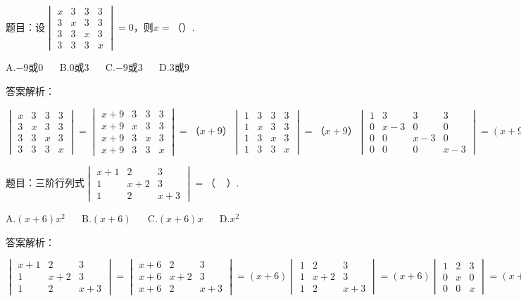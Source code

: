 题目：$设\begin{vmatrix}x&3&3&3\\3&x&3&3\\3&3&x&3\\3&3&3&x\end{vmatrix}=0，则x=（）.$

A.$-9或0$ $\quad$ B.$0或3$ $\quad$ C.$-9或3$ $\quad$ D.$3或9$

答案解析：

$\begin{vmatrix}x&3&3&3\\3&x&3&3\\3&3&x&3\\3&3&3&x\end{vmatrix}=\begin{vmatrix}x+9&3&3&3\\x+9&x&3&3\\x+9&3&x&3\\x+9&3&3&x\end{vmatrix}=（x+9）\begin{vmatrix}1&3&3&3\\1&x&3&3\\1&3&x&3\\1&3&3&x\end{vmatrix}=（x+9）\begin{vmatrix}1&3&3&3\\0&x-3&0&0\\0&0&x-3&0\\0&0&0&x-3\end{vmatrix}=\left(x+9\right)\left(x-3\right)^3=0.$



题目：$\mathrm{三阶行列式}\begin{vmatrix}x+1&2&3\\1&x+2&3\\1&2&x+3\end{vmatrix}=（\;\;\;\;）.\;$

A.$\left(x+6\right)x^2$ $\quad$ B.$\left(x+6\right)$ $\quad$ C.$\left(x+6\right)x$ $\quad$ D.$x^2$

答案解析：

$\begin{vmatrix}x+1&2&3\\1&x+2&3\\1&2&x+3\end{vmatrix}=\begin{vmatrix}x+6&2&3\\x+6&x+2&3\\x+6&2&x+3\end{vmatrix}=\left(x+6\right)\begin{vmatrix}1&2&3\\1&x+2&3\\1&2&x+3\end{vmatrix}=\left(x+6\right)\begin{vmatrix}1&2&3\\0&x&0\\0&0&x\end{vmatrix}=\left(x+6\right)x^2.$



